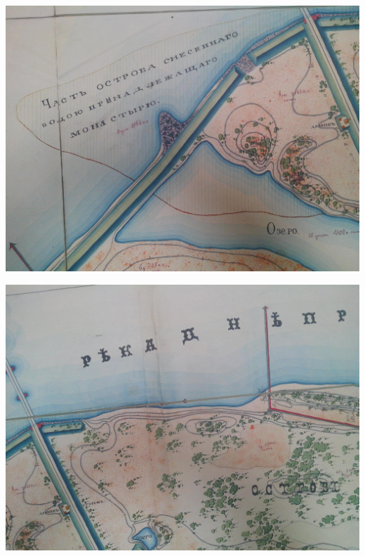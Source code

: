 \begin{center}
\includegraphics[width=\linewidth]{chast-vosp/zver/IMG_20170627_153904.jpg}
\end{center}

\begin{center}
\includegraphics[width=\linewidth]{chast-vosp/zver/IMG_20170627_153852.jpg}
\end{center}

